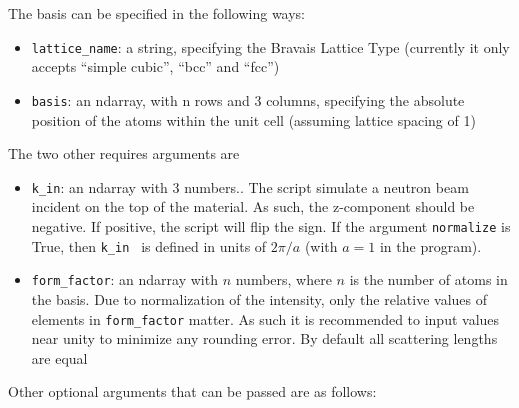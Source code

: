 \documentclass[a4paper,11pt]{article}
\numberwithin{equation}{section}
\begin{document}
	The basis can be specified in the following ways:
	\begin{itemize}
		\item \texttt{lattice\_name}: a string, specifying the Bravais Lattice Type (currently it only accepts ``simple cubic'', ``bcc'' and ``fcc'')
		\item \texttt{basis}: an ndarray, with n rows and 3 columns, specifying the absolute position of the atoms within the unit cell (assuming lattice spacing of 1)
	\end{itemize}
	The two other requires arguments are
	\begin{itemize}
		\item \texttt{k\_in}: an ndarray with 3 numbers.. The script simulate a neutron beam incident on the top of the material. As such, the z-component should be negative. If positive, the script will flip the sign. If the argument \texttt{normalize} is True, then \texttt{k\_in } is defined in units of $ 2\pi/a $ (with $ a = 1$ in the program).
		\item \texttt{form\_factor}: an ndarray with $ n $ numbers, where $ n $ is the number of atoms in the basis. Due to normalization of the intensity, only the relative values of elements in \texttt{form\_factor} matter. As such it is recommended to input values near unity to minimize any rounding error. By default all scattering lengths are equal
	\end{itemize}
	Other optional arguments that can be passed are as follows:
\end{document}
